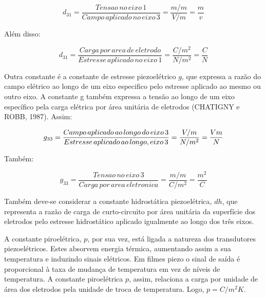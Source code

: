 \documentclass[
	12pt,				
	oneside,			
	a4paper,			
	english,			
	brazil,			
	]{abntex2ppgsi}
\begin{document}
\begin{equation}
	d_{31} = \frac{Tensao \,no \,eixo \,1}{Campo \,aplicado \,no \,eixo \,3} = \frac{m/m}{V/m} = \frac{m}{v}
	\label{eq: Constante de Tensão Piezoelétrica}
\end{equation}



Além disso:

\begin{equation}
	d_{31} = \frac{Carga \,por \,area \,de \,eletrodo}{Estresse \,aplicado \,no \,eixo \,1} = \frac{C/m^{2}}{N/m^{2}} = \frac{C}{N}
	\label{eq: Boa pergunta}
\end{equation}

Outra constante é a constante de estresse piezoelétrico $g$, que expressa a razão do campo elétrico ao longo de um eixo especifico pelo estresse aplicado ao mesmo ou outro eixo. A constante g também expressa a tensão ao longo de um eixo específico pela carga elétrica por área unitária de eletrodos (CHATIGNY e ROBB, 1987). Assim:

\begin{equation}
	g_{33} = \frac{Campo \,aplicado \,ao \,longo \,do \,eixo \,3}{Estresse \,aplicado \,ao \,longo ,\do \,eixo \,3} = \frac{V/m}{N/m^{2}} = \frac{Vm}{N}
	\label{eq: Constante G, expressando a razão do campo elétrico ao longo do eixo.}
\end{equation}

Também:

\begin{equation}
	g_{33} = \frac{Tensao \,no \,eixo \,3}{Carga \,por \,area \,eletronica} = \frac{m/m}{C/m^{2}} = \frac{m^{2}}{C}
	\label{eq: Contante G, expressando a tensão ao longo de um eixo específico pela carga elétrica por área unitária de eletrodos.}
\end{equation}

Também deve-se considerar a constante hidrostática piezoelétrica, $dh$, que representa a razão de carga de curto-circuito por área unitária da superfície dos eletrodos pelo estresse hidrostático aplicado igualmente ao longo dos três eixos. 

A constante piroelétrica, $p$, por sua vez, está ligada a natureza dos transdutores piezoelétricos. Estes absorvem energia térmica, aumentando assim a sua temperatura e induzindo sinais elétricos. Em filmes piezo o sinal de saída é proporcional à taxa de mudança de temperatura em vez de níveis de temperatura. A constante piroelétrica $p$, assim, relaciona a carga por unidade de área dos eletrodos pela unidade de troca de temperatura. Logo, $p = C/m^{2} K$.
\end{document}
